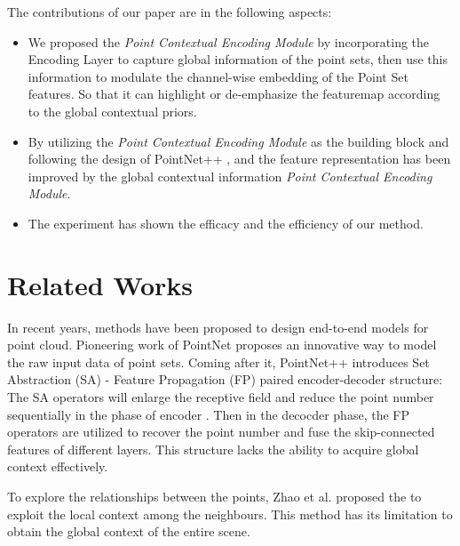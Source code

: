 \documentclass[runningheads]{llncs}
\begin{document}
The contributions of our paper are in the following aspects:
\begin{itemize}
    \item %
    We proposed the \emph{Point Contextual Encoding Module} by incorporating the Encoding Layer to capture global information of the point sets, then use this information to modulate the channel-wise embedding of the Point Set features. So that it can highlight or de-emphasize the featuremap  according to the global contextual priors.
    
    \item  By utilizing the  \emph{Point Contextual Encoding Module}  as the building block and following the design of PointNet++ , and the feature representation has been improved by the global contextual information  \emph{Point Contextual Encoding Module}.
 
    \item The experiment has shown  the efficacy and the efficiency of our method.
    
\end{itemize}

\section{Related Works}
\label{related_works}


In recent years,  methods \cite{pointcnn,sawnet,relation-shape,ASIS,Graph_Network,kpconv,Pointconv,Geo-CNN,Tangent_Convolution,A-cnn,shape_matching,shapecontextnet} have been proposed to design end-to-end models for point cloud. Pioneering work of PointNet \cite{pointnet} proposes an innovative way to model the raw input data of point sets. Coming after it, PointNet++ \cite{pointnet++}  introduces  Set Abstraction (SA) - Feature Propagation (FP) paired encoder-decoder  structure: The SA operators  will enlarge the receptive field and reduce the point number sequentially in the phase of encoder . Then in the decocder phase, the FP operators are utilized to recover the point number and fuse the skip-connected features of different layers. This structure lacks the ability to acquire global context effectively.


To explore the relationships between the  points, Zhao et al. proposed the \cite{pointweb} to exploit the local context among the neighbours. This method has its limitation to obtain the global context of the entire scene.
\end{document}
